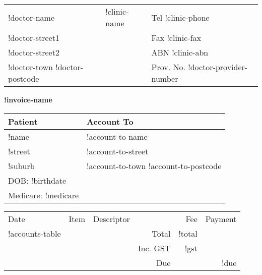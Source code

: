 \documentclass[12pt]{article}
\begin{document}
\begin{center}
\begin{tabular}{p{}>{\centering}p{}<{\centering}p{}<{\raggedleft}}
!doctor-name & {\Large !clinic-name } & Tel !clinic-phone \\
!doctor-street1 &  & Fax !clinic-fax \\
!doctor-street2 & & ABN !clinic-abn \\
!doctor-town !doctor-postcode & & Prov. No. !doctor-provider-number\\ 
\hline
\end{tabular}

\vspace{7mm}

{ \Large \textbf{!invoice-name} }

\end{center}

\vspace{7mm}

\begin{tabular}{ll} 
Patient & Account To \\ \midrule
!name & !account-to-name\\
!street & !account-to-street \\
!suburb & !account-to-town !account-to-postcode \\
DOB: !birthdate &  \\
Medicare:   !medicare & \\ 
\end{tabular}

\vspace{7mm}

\begin{tabularx}{\textwidth}{llXrrr}
Date & Item & Descriptor & & Fee & Payment \\ \cmidrule(l){1-6}
!accounts-table
\cmidrule(l){5-6}
& & & Total & !total  & \\
& & & Inc. GST & !gst & \\ \cmidrule(l){5-6}
& & & Due & & !due \\

\end{tabularx}
\end{document}

